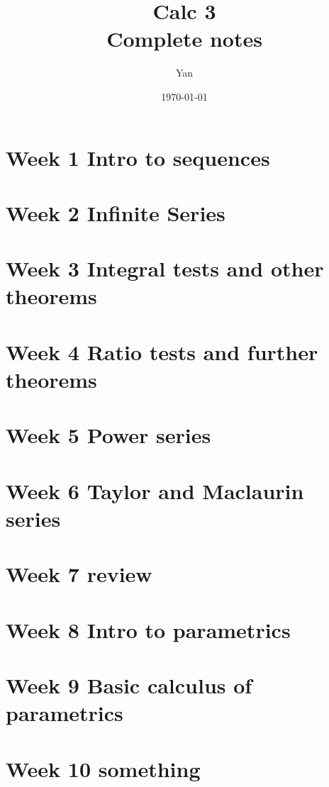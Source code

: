 \documentclass{report}
\title{\Huge{Calc 3}\\ Complete notes}
\author{\huge{Yan}}
\date{\today}
\begin{document}
\maketitle
\tableofcontents
\pagebreak

\chapter{Week 1 Intro to sequences}

\chapter{Week 2 Infinite Series}

\chapter{Week 3 Integral tests and other theorems}

\chapter{Week 4 Ratio tests and further theorems}

\chapter{Week 5 Power series}

\chapter{Week 6 Taylor and Maclaurin series}

\chapter{Week 7 review}

\chapter{Week 8 Intro to parametrics}

\chapter{Week 9 Basic calculus of parametrics}

\chapter{Week 10 something}

\end{document}
